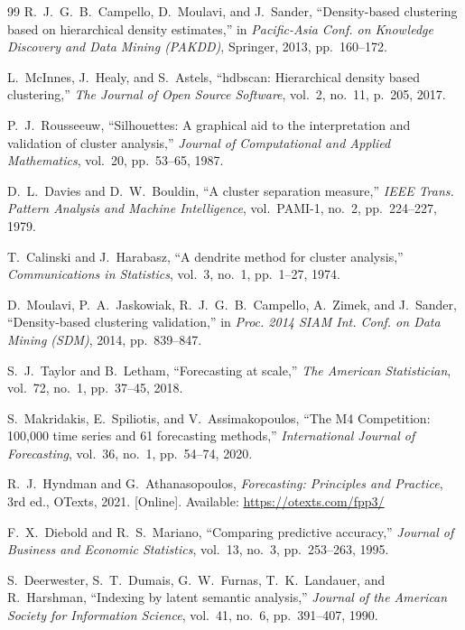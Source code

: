 \documentclass[conference]{IEEEtran}
\begin{document}
\begin{thebibliography}{99}
R.~J.~G.~B.~Campello, D.~Moulavi, and J.~Sander,
``Density-based clustering based on hierarchical density estimates,''
in \emph{Pacific-Asia Conf. on Knowledge Discovery and Data Mining
(PAKDD)}, Springer, 2013, pp.~160--172.

L.~McInnes, J.~Healy, and S.~Astels,
``hdbscan: Hierarchical density based clustering,''
\emph{The Journal of Open Source Software},
vol.~2, no.~11, p.~205, 2017.

P.~J.~Rousseeuw,
``Silhouettes: A graphical aid to the interpretation and validation
of cluster analysis,''
\emph{Journal of Computational and Applied Mathematics},
vol.~20, pp.~53--65, 1987.

D.~L.~Davies and D.~W.~Bouldin,
``A cluster separation measure,''
\emph{IEEE Trans. Pattern Analysis and Machine Intelligence},
vol.~PAMI-1, no.~2, pp.~224--227, 1979.

T.~Calinski and J.~Harabasz,
``A dendrite method for cluster analysis,''
\emph{Communications in Statistics},
vol.~3, no.~1, pp.~1--27, 1974.

D.~Moulavi, P.~A.~Jaskowiak, R.~J.~G.~B.~Campello, A.~Zimek,
and J.~Sander,
``Density-based clustering validation,''
in \emph{Proc. 2014 SIAM Int. Conf. on Data Mining (SDM)},
2014, pp.~839--847.

S.~J.~Taylor and B.~Letham,
``Forecasting at scale,''
\emph{The American Statistician},
vol.~72, no.~1, pp.~37--45, 2018.

S.~Makridakis, E.~Spiliotis, and V.~Assimakopoulos,
``The M4 Competition: 100{,}000 time series and 61 forecasting
methods,''
\emph{International Journal of Forecasting},
vol.~36, no.~1, pp.~54--74, 2020.

R.~J.~Hyndman and G.~Athanasopoulos,
\emph{Forecasting: Principles and Practice}, 3rd ed.,
OTexts, 2021.
[Online]. Available: \url{https://otexts.com/fpp3/}

F.~X.~Diebold and R.~S.~Mariano,
``Comparing predictive accuracy,''
\emph{Journal of Business and Economic Statistics},
vol.~13, no.~3, pp.~253--263, 1995.

S.~Deerwester, S.~T.~Dumais, G.~W.~Furnas, T.~K.~Landauer,
and R.~Harshman,
``Indexing by latent semantic analysis,''
\emph{Journal of the American Society for Information Science},
vol.~41, no.~6, pp.~391--407, 1990.


\end{thebibliography}
\end{document}
